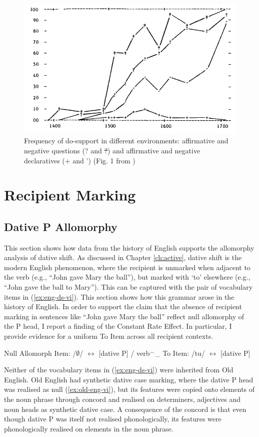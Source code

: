 	\begin{figure}[ht!]
		\includegraphics[width=.5\linewidth]{../images/kroch-graph}
		\caption{Frequency of do-support in different environments: affirmative and negative questions (? and \sout{?}) and affirmative and negative declaratives (+ and ') (Fig. 1 from \citealt{Kroch.1989})}
		\label{fig:kroch-graph}
	\end{figure}

\section{Recipient Marking}
\subsection{Dative P Allomorphy}
This section shows how data from the history of English supports the allomorphy analysis of dative shift. As discussed in Chapter \ref{ch:active}, dative shift is the modern English phenomenon, where the recipient is unmarked when adjacent to the verb (e.g., ``John gave Mary the ball''), but marked with `to' elsewhere (e.g., ``John gave the ball to Mary''). This can be captured with the pair of vocabulary items in (\ref{ex:eng-ds-vi}). This section shows how this grammar arose in the history of English. In order to support the claim that the absence of recipient marking in sentences like ``John gave Mary the ball'' reflect null allomorphy of the P head, I report a finding of the Constant Rate Effect. In particular, I provide evidence for a uniform To Item across all recipient contexts.  

	\begin{exe}
		\ex \label{ex:eng-ds-vi}
		\begin{xlist}
			\ex Null Allomorph Item: /$\emptyset$/ $\leftrightarrow$ [dative P] / verb$^{\smallfrown}$\_
			\ex To Item: /tu/ $\leftrightarrow$ [dative P]
		\end{xlist}
	\end{exe}


	Neither of the vocabulary items in (\ref{ex:eng-ds-vi}) were inherited from Old English. Old English had synthetic dative case marking, where the dative P head was realised as null (\ref{ex:old-eng-vi}), but its features were copied onto elements of the noun phrase through concord and realised on determiners, adjectives and noun heads as synthetic dative case. A consequence of the concord is that even though dative P was itself not realised phonologically, its features were phonologically realised on elements in the noun phrase. 
	
